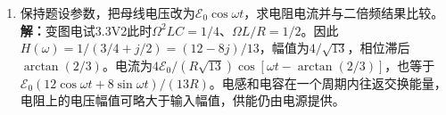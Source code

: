 \documentclass[UTF8,fontset=fandol,a4paper,11pt]{ctexart}
\begin{document}
\begin{enumerate}
\item 保持题设参数，把母线电压改为$\mathcal E_0\cos\omega t$，求电阻电流并与二倍频结果比较。
\textbf{解：}变图电试3.3V2此时$\Omega^2LC=1/4$、$\Omega L/R=1/2$。因此$H(\omega)=1/(3/4+j/2)=(12-8j)/13$，幅值为$4/\sqrt{13}$，相位滞后$\arctan(2/3)$。电流为$4\mathcal E_0/(R\sqrt{13})\cos[\omega t-\arctan(2/3)]$，也等于$\mathcal E_0(12\cos\omega t+8\sin\omega t)/(13R)$。电感和电容在一个周期内往返交换能量，电阻上的电压幅值可略大于输入幅值，供能仍由电源提供。
\begin{center}\begin{minipage}{.98\linewidth}\centering
{}
\end{minipage}
\end{center}
\end{enumerate}
\end{document}
